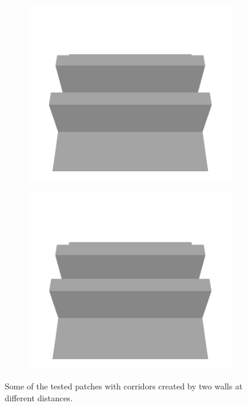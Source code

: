 \documentclass[../document.tex]{subfiles}
\begin{document}
\begin{figure}[htbp]
\begin{subfigure}[b]{0.24\linewidth}
    \includegraphics[width=\linewidth]{../img/5/custom_patches/tunnel/all/08-3d.png}
    \end{subfigure}
    \begin{subfigure}[b]{0.24\linewidth}
    \includegraphics[width=\linewidth]{../img/5/custom_patches/tunnel/all/09-3d.png}
    \end{subfigure}
    \caption{Some of the tested patches with corridors created by two walls at different distances.}
    \label{fig : tunnels}
\end{figure}
\end{document}
